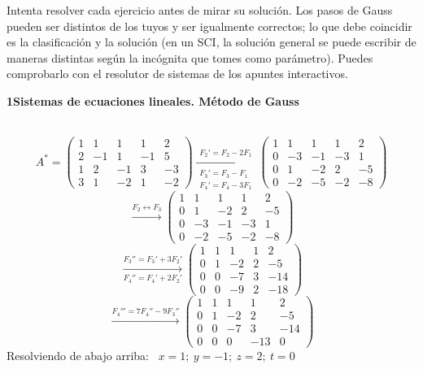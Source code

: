 \documentclass[11pt,a4paper]{article}
\newcounter{exer}
\newcommand{\ex}[1]{\par\needspace{4\baselineskip}\medskip\refstepcounter{exer}\noindent{\color{navy}\bfseries\theexer.}\ \ }
\newcommand{\seccio}[2]{\par\needspace{10\baselineskip}\bigskip
  \begin{tcolorbox}[colback=navy,colframe=navy,coltext=white,arc=2mm,boxrule=0pt,left=3mm,right=3mm,top=1.2mm,bottom=1.2mm]
  {\large\bfseries #1\quad #2}
  \end{tcolorbox}\vspace{-2pt}}
\newcommand{\res}[1]{\boxed{#1}}\newcommand{\rest}[1]{\fbox{#1}}
\begin{document}
\thispagestyle{primera}

\vspace{8pt}

\begin{tcolorbox}[colback=soft,colframe=soft,arc=2mm,left=3mm,right=3mm,top=1.5mm,bottom=1.5mm]
\small Intenta resolver cada ejercicio antes de mirar su solución. Los pasos de Gauss pueden ser distintos de los tuyos y ser igualmente correctos; lo que debe coincidir es la clasificación y la solución (en un SCI, la solución general se puede escribir de maneras distintas según la incógnita que tomes como parámetro). Puedes comprobarlo con el resolutor de sistemas de los apuntes interactivos.
\end{tcolorbox}

\seccio{1}{Sistemas de ecuaciones lineales. Método de Gauss}

\ex{1} \label{ex:g4}\[A^*=\left(\begin{array}{rrrr|r}1 & 1 & 1 & 1 & 2\\2 & -1 & 1 & -1 & 5\\1 & 2 & -1 & 3 & -3\\3 & 1 & -2 & 1 & -2\end{array}\right)\xrightarrow[\substack{F_3'=F_3-F_1\\F_4'=F_4-3F_1}]{F_2'=F_2-2F_1}\left(\begin{array}{rrrr|r}1 & 1 & 1 & 1 & 2\\0 & -3 & -1 & -3 & 1\\0 & 1 & -2 & 2 & -5\\0 & -2 & -5 & -2 & -8\end{array}\right)\]\[\xrightarrow{F_2\leftrightarrow F_3}\left(\begin{array}{rrrr|r}1 & 1 & 1 & 1 & 2\\0 & 1 & -2 & 2 & -5\\0 & -3 & -1 & -3 & 1\\0 & -2 & -5 & -2 & -8\end{array}\right)\]\[\xrightarrow[F_4''=F_4'+2F_2']{F_3''=F_3'+3F_2'}\left(\begin{array}{rrrr|r}1 & 1 & 1 & 1 & 2\\0 & 1 & -2 & 2 & -5\\0 & 0 & -7 & 3 & -14\\0 & 0 & -9 & 2 & -18\end{array}\right)\]\[\xrightarrow{F_4'''=7F_4''-9F_3''}\left(\begin{array}{rrrr|r}1 & 1 & 1 & 1 & 2\\0 & 1 & -2 & 2 & -5\\0 & 0 & -7 & 3 & -14\\0 & 0 & 0 & -13 & 0\end{array}\right)\]Resolviendo de abajo arriba: \ $\res{x=1;\ y=-1;\ z=2;\ t=0}$
\end{document}
